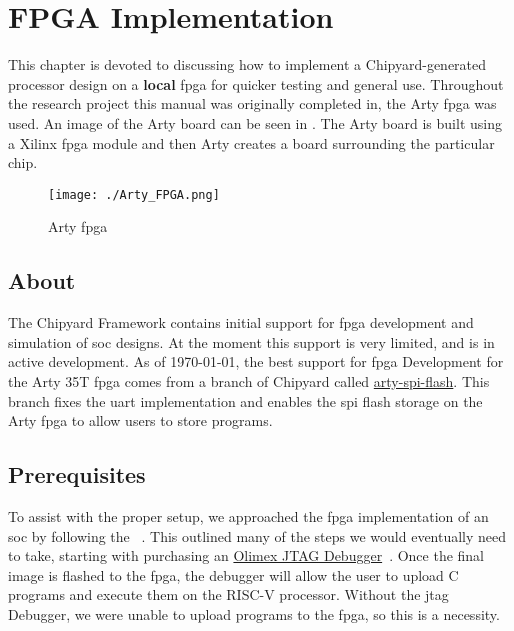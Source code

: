 \chapter{FPGA Implementation}\label{chap:FPGA_Implementation}
This chapter is devoted to discussing how to implement a Chipyard-generated processor design on a \textbf{local} \gls{fpga} for quicker testing and general use.
Throughout the research project this manual was originally completed in, the Arty \gls{fpga} was used.
An image of the Arty board can be seen in .
The Arty board is built using a Xilinx \gls{fpga} module and then Arty creates a board surrounding the particular chip.

\begin{figure}[h!tbp]
  \centering
  \texttt{[image: ./Arty\_FPGA.png]}
  \caption{Arty \Gls{fpga}}
  \label{fig:Arty_FPGA}
\end{figure}

\section{About}\label{sec:About}
The Chipyard Framework contains initial support for \gls{fpga} development and simulation of \gls{soc} designs.
At the moment this support is very limited, and is in active development.
As of \today, the best support for \Gls{fpga} Development for the Arty 35T \Gls{fpga} comes from a branch of Chipyard called \href{https://github.com/ucb-bar/chipyard/tree/arty-spi-flash}{arty-spi-flash}.
This branch fixes the \gls{uart} implementation and enables the \gls{spi} flash storage on the Arty \Gls{fpga} to allow users to store programs.

\section{Prerequisites}\label{sec:Prerequisites}
To assist with the proper setup, we approached the \Gls{fpga} implementation of an \Gls{soc} by following the ~\cite{FreedomDevGuide}.
This outlined many of the steps we would eventually need to take, starting with purchasing an \href{https://www.digikey.com/en/products/detail/olimex-ltd/ARM-USB-TINY-H/3471388}{Olimex JTAG Debugger}~\cite{OlimexJTAG}.
Once the final image is flashed to the \Gls{fpga}, the debugger will allow the user to upload C programs and execute them on the RISC-V processor. Without the \gls{jtag} Debugger, we were unable to upload programs to the \Gls{fpga}, so this is a necessity.

